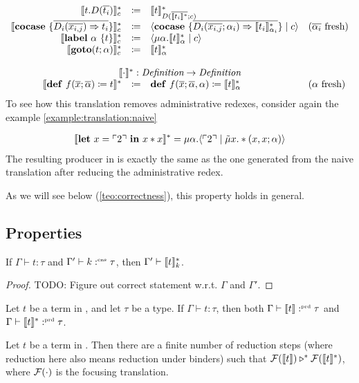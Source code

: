 \[\begin{array}{rcll}
    \translatestar{t.D(\overline{t_i})}{c} & \coloneq & \translatestar{t}{D(\overline{\translatestar{t_i}{}}; c)} & \\
    \translatestar{\cocase{\overline{D_i(\overline{x_{i,j}}) \Rightarrow t_i}}}{c} & \coloneq & \cut{\cocase{\overline{D_i(\overline{x_{i,j}}; \alpha_i) \Rightarrow \translatestar{t_i}{\alpha_i}}}}{c} & \fresh{\overline{\alpha_i}} \\
    \translatestar{\lab{\alpha}{t}}{c} & \coloneq & \cut{\mu \alpha.\translatestar{t}{\alpha}}{c} & \\
    \translatestar{\goto{t}{\alpha}}{c} & \coloneq & \translatestar{t}{\alpha} & \\
    \\
    \multicolumn{4}{c}{\translatestar{\cdot}{} : \emph{Definition} \rightarrow \emph{Definition}}\\
    \translatestar{\defi{f(\overline{x}; \overline{\alpha})}{t}}{} & \coloneq & \defi{f(\overline{x}; \overline{\alpha}, \alpha)}{\translatestar{t}{\alpha}} & \fresh{\alpha}
  \end{array}
\]
To see how this translation removes administrative redexes, consider again the example \cref{example:translation:naive}
\begin{example}
  \begin{align*}
    \llbracket \mathbf{let}\ x = \ulcorner 2 \urcorner\ \mathbf{in}\ x*x \rrbracket^* = \mu\alpha.\langle \ulcorner 2 \urcorner \mid \tilde\mu x.*(x,x;\alpha) \rangle
  \end{align*}
  The resulting producer in \targetlang{} is exactly the same as the one generated from the naive translation after reducing the administrative redex.
\end{example}
As we will see below (\cref{teo:correctness}), this property holds in general.

\subsection{Properties}
\label{subsec:translation:properties}

\begin{lemma}
  If $\Gamma \vdash t : \tau$ and $\Gamma' \vdash k :^{\text{\tiny cns}} \tau$, then $\Gamma' \vdash \llbracket t \rrbracket_{k}^{\ast}$.
\end{lemma}
\begin{proof}
  TODO: Figure out correct statement w.r.t. $\Gamma$ and $\Gamma'$.
\end{proof}

\begin{theorem}
  Let $t$ be a term in \surfacelang, and let $\tau$ be a type.
  If $\Gamma \vdash t: \tau$, then both $\Gamma \vdash \llbracket t \rrbracket :^{\text{\tiny prd}} \tau$ and $\Gamma \vdash \llbracket t \rrbracket_{}^{\ast} :^{\text{\tiny prd}} \tau$.
\end{theorem}

\begin{theorem}[Correctness]
  \label{teo:correctness}
  Let $t$ be a term in \surfacelang. Then there are a finite number of reduction steps (where reduction here also means reduction under binders) such that $\mathcal{F}(\llbracket t \rrbracket) \triangleright^{\ast} \mathcal{F}(\llbracket t \rrbracket_{}^{\ast})$, where $\mathcal{F}(\cdot)$ is the focusing translation.
\end{theorem}

